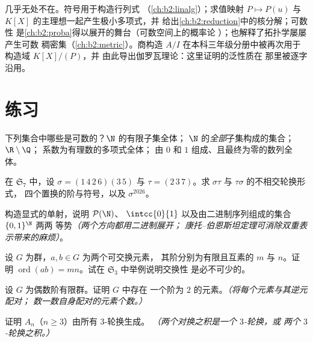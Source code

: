 \begin{remark}[本章的应用]
几乎无处不在。符号用于构造行列式
（\cref{ch:b2:linalg}）；求值映射 $P \mapsto P(u)$
与 $K[X]$ 的主理想一起产生极小多项式，并
给出\cref{ch:b2:reduction}中的核分解；可数性
是\cref{ch:b2:proba}得以展开的舞台（可数空间上的概率论
）；也解释了拓扑学屡屡产生可数
稠密集（\cref{ch:b2:metric}）。商构造 $A/I$
在本科三年级分册中被再次用于构造域 $K[X]/(P)$，并
由此导出伽罗瓦理论：这里证明的泛性质在
那里被逐字沿用。
\end{remark}

\section{练习}

\begin{exercise}[$\star$]\label{exo:b2:structures:1}
下列集合中哪些是可数的？$\N$ 的有限子集全体；
$\N$ 的\emph{全部}子集构成的集合；$\R \setminus \Q$；
系数为有理数的多项式全体；
由 $0$ 和 $1$ 组成、且最终为零的数列全体。
\end{exercise}

\begin{exercise}[$\star$]\label{exo:b2:structures:2}
在 $\mathfrak{S}_7$ 中，设 $\sigma = (1\,4\,2\,6)(3\,5)$ 与 $\tau =
(2\,3\,7)$。求 $\sigma\tau$ 与 $\tau\sigma$ 的不相交轮换形式，
四个置换的阶与符号，以及
$\sigma^{2026}$。
\end{exercise}

\begin{exercise}[$\star$]\label{exo:b2:structures:3}
构造显式的单射，说明 $\mathcal{P}(\N)$、
$\intcc{0}{1}$ 以及由二进制序列组成的集合 $\{0,1\}^{\N}$ 两两
等势\emph{（两个方向都用二进制展开；
康托–伯恩斯坦定理可消除双重表示带来的麻烦）}。
\end{exercise}

\begin{exercise}[$\star$]\label{exo:b2:structures:4}
设 $G$ 为群，$a, b \in G$ 为两个可交换元素，
其阶分别为有限且互素的 $m$ 与 $n$。证明 $\operatorname{ord}(ab) =
mn$。试在 $\mathfrak{S}_3$ 中举例说明交换性
是必不可少的。
\end{exercise}

\begin{exercise}[$\star\star$]\label{exo:b2:structures:5}
设 $G$ 为偶数阶有限群。证明 $G$ 中存在
一个阶为 $2$ 的元素。\emph{（将每个元素与其逆元配对；
数一数自身配对的元素个数。）}
\end{exercise}

\begin{exercise}[$\star\star$]\label{exo:b2:structures:6}
证明 $A_n$（$n \geq 3$）由所有 $3$-轮换生成。
\emph{（两个对换之积是一个 $3$-轮换，或
两个 $3$-轮换之积。）}
\end{exercise}

